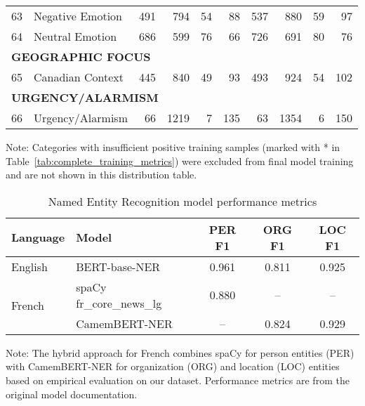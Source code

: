 \documentclass[12pt]{article}
\begin{document}
{\begin{longtable}{p{0.5cm}p{5.5cm}rrrrrrrr}
63 & Negative Emotion & 491 & 794 & 54 & 88 & 537 & 880 & 59 & 97 \\
64 & Neutral Emotion & 686 & 599 & 76 & 66 & 726 & 691 & 80 & 76 \\
\multicolumn{10}{l}{\cellcolor{gray!10}\textbf{GEOGRAPHIC FOCUS}} \\
\midrule
65 & Canadian Context & 445 & 840 & 49 & 93 & 493 & 924 & 54 & 102 \\
\multicolumn{10}{l}{\cellcolor{gray!10}\textbf{URGENCY/ALARMISM}} \\
\midrule
66 & Urgency/Alarmism & 66 & 1219 & 7 & 135 & 63 & 1354 & 6 & 150 \\
\bottomrule
\end{longtable}
\vspace{0.5em}
\noindent\footnotesize
Note: Categories with insufficient positive training samples (marked with * in Table~\ref{tab:complete_training_metrics}) were excluded from final model training and are not shown in this distribution table.
} %
\endlandscape
\begin{table}[h!]
\centering
\caption{Named Entity Recognition model performance metrics}
\label{tab:ner_performance}
\small
\begin{tabular}{llccc}
\toprule
\textbf{Language} & \textbf{Model} & \textbf{PER F1} & \textbf{ORG F1} & \textbf{LOC F1} \\
\midrule
English & BERT-base-NER & 0.961 & 0.811 & 0.925 \\
\midrule
\multirow{2}{*}{French} & spaCy fr\_core\_news\_lg & 0.880 & -- & -- \\
& CamemBERT-NER & -- & 0.824 & 0.929 \\
\bottomrule
\end{tabular}

\vspace{0.5em}
\noindent\footnotesize
Note: The hybrid approach for French combines spaCy for person entities (PER) with CamemBERT-NER for organization (ORG) and location (LOC) entities based on empirical evaluation on our dataset. Performance metrics are from the original model documentation.
\end{table}
\landscape
\end{document}
